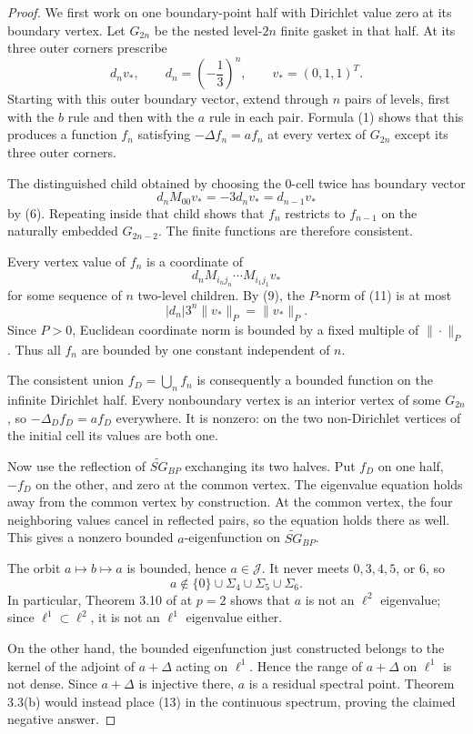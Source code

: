 \documentclass[11pt]{article}
\newcommand{\SG}{\widetilde{SG}}
\newcommand{\J}{\mathcal J}
\begin{document}
\begin{proof}
We first work on one boundary-point half with Dirichlet value zero at its
boundary vertex. Let $G_{2n}$ be the nested level-$2n$ finite gasket in that
half. At its three outer corners prescribe
\[
 d_n v_*,\qquad d_n=\left(-\frac13\right)^n,\qquad
 v_*=(0,1,1)^T.                                              \tag{10}
\]
Starting with this outer boundary vector, extend through $n$ pairs of levels,
first with the $b$ rule and then with the $a$ rule in each pair. Formula (1)
shows that this produces a function $f_n$ satisfying
$-\Delta f_n=af_n$ at every vertex of $G_{2n}$ except its three outer
corners.

The distinguished child obtained by choosing the $0$-cell twice has boundary
vector
\[
 d_nM_{00}v_*=-3d_nv_*=d_{n-1}v_*
\]
by (6). Repeating inside that child shows that $f_n$ restricts to $f_{n-1}$
on the naturally embedded $G_{2n-2}$. The finite functions are therefore
consistent.

Every vertex value of $f_n$ is a coordinate of
\[
 d_nM_{i_nj_n}\cdots M_{i_1j_1}v_*                         \tag{11}
\]
for some sequence of $n$ two-level children. By (9), the $P$-norm of (11)
is at most
\[
 |d_n|3^n\|v_*\|_P=\|v_*\|_P.                              \tag{12}
\]
Since $P>0$, Euclidean coordinate norm is bounded by a fixed multiple of
$\|\cdot\|_P$. Thus all $f_n$ are bounded by one constant independent of
$n$.

The consistent union $f_D=\bigcup_nf_n$ is consequently a bounded function
on the infinite Dirichlet half. Every nonboundary vertex is an interior
vertex of some $G_{2n}$, so $-\Delta_Df_D=af_D$ everywhere. It is nonzero:
on the two non-Dirichlet vertices of the initial cell its values are both one.

Now use the reflection of $\SG_{BP}$ exchanging its two halves. Put $f_D$ on
one half, $-f_D$ on the other, and zero at the common vertex. The eigenvalue
equation holds away from the common vertex by construction. At the common
vertex, the four neighboring values cancel in reflected pairs, so the
equation holds there as well. This gives a nonzero bounded $a$-eigenfunction
on $\SG_{BP}$.

The orbit $a\mapsto b\mapsto a$ is bounded, hence $a\in\J$. It never meets
$0,3,4,5$, or $6$, so
\[
 a\notin\{0\}\cup\Sigma_4\cup\Sigma_5\cup\Sigma_6.       \tag{13}
\]
In particular, Theorem 3.10 of \cite{CHQSZ} at $p=2$ shows that $a$ is not
an $\ell^2$ eigenvalue; since $\ell^1\subset\ell^2$, it is not an
$\ell^1$ eigenvalue either.

On the other hand, the bounded eigenfunction just constructed belongs to the
kernel of the adjoint of $a+\Delta$ acting on $\ell^1$. Hence the range of
$a+\Delta$ on $\ell^1$ is not dense. Since $a+\Delta$ is injective there,
$a$ is a residual spectral point. Theorem 3.3(b) would instead place (13) in
the continuous spectrum, proving the claimed negative answer.
\end{proof}
\end{document}
